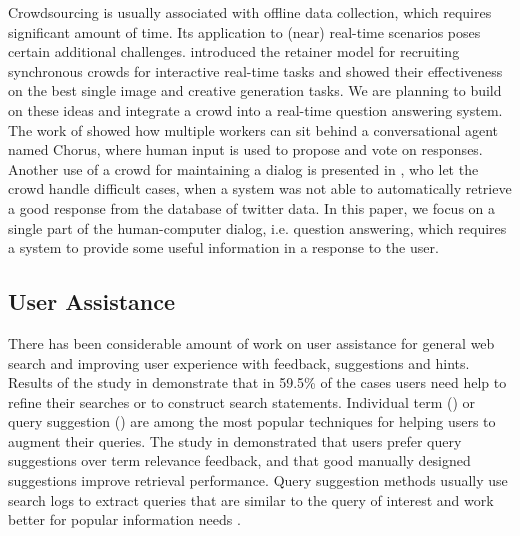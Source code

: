 Crowdsourcing is usually associated with offline data collection, which requires significant amount of time.
Its application to (near) real-time scenarios poses certain additional challenges.
\cite{bernstein2011crowds} introduced the retainer model for recruiting synchronous crowds for interactive real-time tasks and showed their effectiveness on the best single image and creative generation tasks.
We are planning to build on these ideas and integrate a crowd into a real-time question answering system.
The work of \cite{Lasecki:2013:CCC:2501988.2502057} showed how multiple workers can sit behind a conversational agent named Chorus, where human input is used to propose and vote on responses. 
Another use of a crowd for maintaining a dialog is presented in \cite{Bessho:2012:DSU:2392800.2392841}, who let the crowd handle difficult cases, when a system was not able to automatically retrieve a good response from the database of twitter data.
In this paper, we focus on a single part of the human-computer dialog, i.e. question answering, which requires a system to provide some useful information in a response to the user.



\subsection{User Assistance}
\label{subsec:rel_work:user:assistance}

There has been considerable amount of work on user assistance for general web search and improving user experience with feedback, suggestions and hints.
Results of the study in \cite{xie2009understanding} demonstrate that in 59.5\% of the cases users need help to refine their searches or to construct search statements.
Individual term (\cite{ruthven2003survey}) or query suggestion (\cite{Bhatia:2011:QSA:2009916.2010023, Cao:2008:CQS:1401890.1401995,Jones:2006:GQS:1135777.1135835}) are among the most popular techniques for helping users to augment their queries.
The study in \cite{Kelly:2009:CQT:1571941.1572006} demonstrated that users prefer query suggestions over term relevance feedback, and that good manually designed suggestions improve retrieval performance.
Query suggestion methods usually use search logs to extract queries that are similar to the query of interest and work better for popular information needs \cite{Bhatia:2011:QSA:2009916.2010023}.

